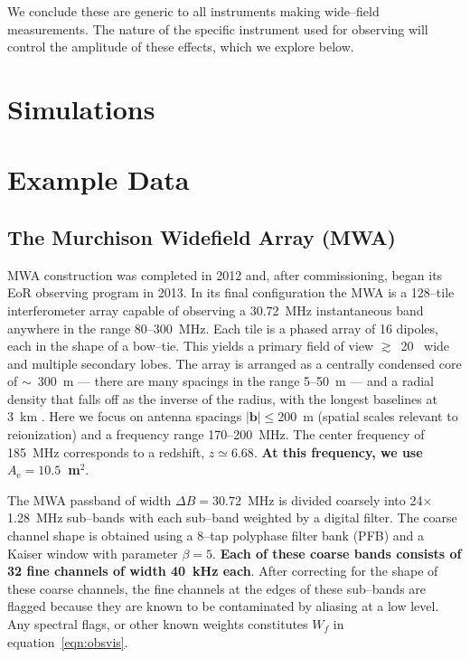 \documentclass[preprint2,iop,numberedappendix]{emulateapj}
\begin{document}
We conclude these are generic to all instruments making wide--field measurements. The nature of the specific instrument used for observing will control the amplitude of these effects, which we explore below. %

\section{Simulations}\label{sec:sim}

\section{Example Data}\label{sec:data}

\subsection{The Murchison Widefield Array (MWA)}\label{sec:instrument}

MWA construction was completed in 2012 and, after commissioning, began its EoR observing program in 2013. In its final configuration the MWA is a 128--tile interferometer array capable of observing a 30.72~MHz instantaneous band anywhere in the range 80--300~MHz. Each tile is a phased array of 16 dipoles, each in the shape of a bow--tie. This yields a primary field of view $\gtrsim$~20\arcdeg~ wide and multiple secondary lobes. The array is arranged as a centrally condensed core of $\sim$~300~m --- there are many spacings in the range 5--50~m --- and a radial density that falls off as the inverse of the radius, with the longest baselines at 3~km \citep{bea12}. Here we focus on antenna spacings $|\boldsymbol{b}| \le 200$~m (spatial scales relevant to reionization) and a frequency range 170--200~MHz. The center frequency of 185~MHz corresponds to a redshift, $z\simeq 6.68$. {\bf At this frequency, we use $A_\textrm{e}=10.5$~m$^2$}.

The MWA passband of width $\Delta B=30.72$~MHz is divided coarsely into 24$\times$1.28~MHz sub--bands with each sub--band weighted by a digital filter. The coarse channel shape is obtained using a 8--tap polyphase filter bank (PFB) and a Kaiser window with parameter $\beta=5$. {\bf Each of these coarse bands consists of 32 fine channels of width 40~kHz each}. After correcting for the shape of these coarse channels, the fine channels at the edges of these sub--bands are flagged because they are known to be contaminated by aliasing at a low level. Any spectral flags, or other known weights constitutes $W_f$ in equation~\ref{eqn:obsvis}. 
\end{document}
